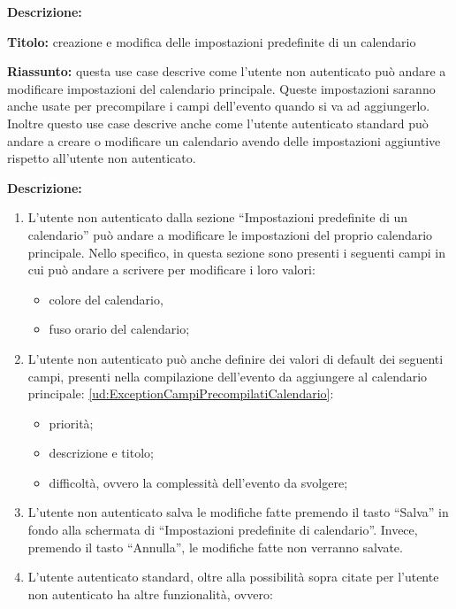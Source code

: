 \begin{listaPersonale}[UC]{}
    \textbf{Descrizione:}

    \textbf{Titolo:} creazione e modifica delle impostazioni predefinite di un calendario

    \textbf{Riassunto:} questa use case descrive come l'utente non autenticato può andare a modificare impostazioni del calendario principale. Queste impostazioni saranno anche usate per precompilare i campi dell'evento quando si va ad aggiungerlo. Inoltre questo use case descrive anche come l'utente autenticato standard può andare a creare o modificare un calendario avendo delle impostazioni aggiuntive rispetto all'utente non autenticato.

    \textbf{Descrizione:}
    \begin{enumerate}
        \item L'utente non autenticato dalla sezione  “Impostazioni predefinite di un calendario” può andare a modificare le impostazioni del proprio calendario principale. Nello specifico, in questa sezione sono presenti i seguenti campi in cui può andare a scrivere per modificare i loro valori:
              \begin{itemize}
                  \item colore del calendario,
                  \item fuso orario del calendario;
              \end{itemize}
        \item L'utente non autenticato può anche definire dei valori di default dei seguenti campi, presenti nella compilazione dell'evento da aggiungere al calendario principale: \ref{ud:ExceptionCampiPrecompilatiCalendario}:
              \begin{itemize}
                  \item priorità;
                  \item descrizione e titolo;
                  \item difficoltà, ovvero la complessità dell'evento da svolgere;
              \end{itemize}
        \item L'utente non autenticato salva le modifiche fatte premendo il tasto “Salva” in fondo alla schermata di “Impostazioni predefinite di calendario”. Invece, premendo il tasto “Annulla”, le modifiche fatte non verranno salvate.
        \item L'utente autenticato standard, oltre alla possibilità sopra citate per l'utente non autenticato ha altre funzionalità, ovvero:

\end{enumerate}
\end{listaPersonale}
